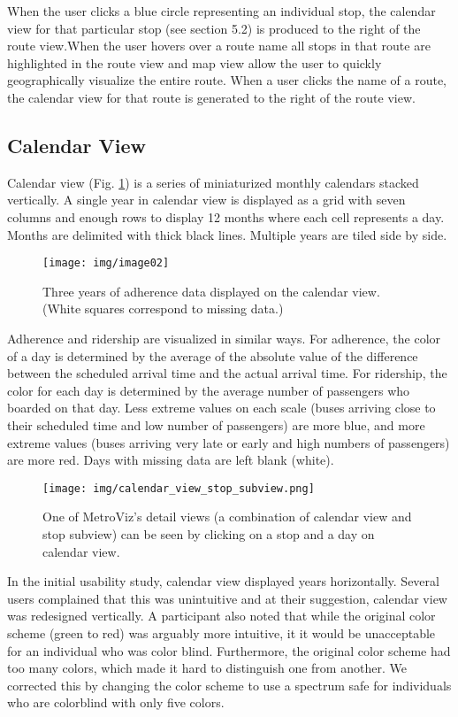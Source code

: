 \documentclass[journal]{vgtc}
\begin{document}
When the user clicks a blue circle representing an individual stop, the calendar view for that particular stop (see section 5.2) is produced to the right of the route view.When the user hovers over a route name all stops in that route are highlighted in the route view and map view allow the user to quickly geographically visualize the entire route. When a user clicks the name of a route, the calendar view for that route is generated to the right of the route view.

\subsection{Calendar View}
Calendar view (Fig. \ref{calendar_view}) is a series of miniaturized monthly calendars stacked vertically. A single year in  calendar view is displayed as a grid with seven columns and enough rows to display 12 months where each cell represents a day. Months are delimited with thick black lines. Multiple years are tiled side by side.

\begin{figure}[htb]
 \centering
 \texttt{[image: img/image02]}
 \caption{Three years of adherence data displayed on the calendar view. (White squares correspond to missing data.)}
 \label{calendar_view}
\end{figure}

Adherence and ridership are visualized in similar ways. For adherence, the color of a day is determined by the average of the absolute value of the difference between the scheduled arrival time and the actual arrival time. For ridership, the color for each day is determined by the average number of passengers who boarded on that day. Less extreme values on each scale (buses arriving close to their scheduled time and low number of passengers) are more blue, and more extreme values (buses arriving very late or early and high numbers of passengers) are more red. Days with missing data are left blank (white).

\begin{figure*}[htb]
 \centering
 \texttt{[image: img/calendar\_view\_stop\_subview.png]}
 \caption{One of MetroViz's detail views (a combination of calendar view and stop subview) can be seen by clicking on a stop and a day on calendar view.}
 \label{calendar_view_big}
\end{figure*}

In the initial usability study, calendar view displayed years horizontally. Several users complained that this was unintuitive and at their suggestion, calendar view was redesigned vertically. A participant also noted that while the original color scheme (green to red) was arguably more intuitive, it it would be unacceptable for an individual who was color blind. Furthermore, the original color scheme had too many colors, which made it hard to distinguish one from another. We corrected this by changing the color scheme to use a spectrum safe for individuals who are colorblind with only five colors.
\end{document}

